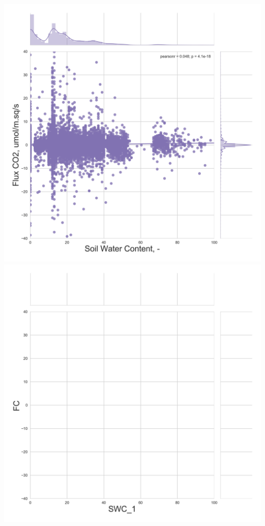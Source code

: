 \documentclass{beamer}
\begin{document}
\begin{frame}
\begin{columns}[t]
\centering
\includegraphics[width=\textwidth]{FvsSWC_night/US-FPe.png}\\
\includegraphics[width=\textwidth]{FvsSWC_night/US-Los.png}
\end{columns}

\end{frame}
\end{document}
